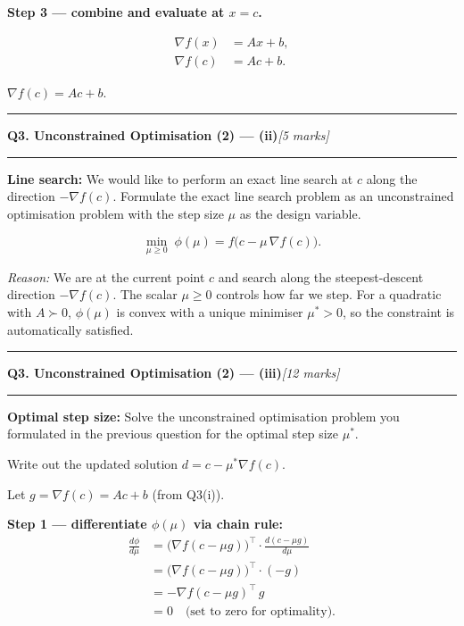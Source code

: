 \documentclass[10pt,a4paper]{article}
\newcommand{\sectitle}[2]{%
  \vspace{10pt}\noindent\rule{\linewidth}{0.8pt}\par\vspace{2pt}%
  {\large\textbf{#1}\hfill\normalsize\textit{[#2 marks]}}\par
  \vspace{2pt}\rule{\linewidth}{0.4pt}\vspace{4pt}}
\newcommand{\reason}[1]{%
  \begin{mdframed}[backgroundcolor=reasonbg, linewidth=0.4pt,
    innertopmargin=3pt, innerbottommargin=3pt,
    innerleftmargin=6pt, innerrightmargin=6pt]
    \small\textit{Reason:} \small #1
  \end{mdframed}\vspace{2pt}}
\newenvironment{resultbox}{%
  \begin{mdframed}[backgroundcolor=boxbg, linewidth=0.6pt,
    innertopmargin=5pt, innerbottommargin=5pt,
    innerleftmargin=8pt, innerrightmargin=8pt]
}{\end{mdframed}}
\begin{document}
\textbf{Step 3 --- combine and evaluate at $x = c$.}

\begin{align*}
  \nabla f(x) &= Ax + b, \\
  \nabla f(c) &= Ac + b.
\end{align*}

\begin{resultbox}
$\nabla f(c) = Ac + b$.
\end{resultbox}

\sectitle{Q3. Unconstrained Optimisation (2) --- (ii)}{5}

\noindent \textbf{Line search:} We would like to perform an exact line search
at $c$ along the direction $-\nabla f(c)$. Formulate the exact line search
problem as an unconstrained optimisation problem with the step size $\mu$
as the design variable.

\begin{resultbox}
\[
  \min_{\mu\ge 0}\;\phi(\mu) = f\!\bigl(c - \mu\,\nabla f(c)\bigr).
\]
\end{resultbox}

\reason{We are at the current point $c$ and search along the steepest-descent
        direction $-\nabla f(c)$. The scalar $\mu\ge 0$ controls how far we step.
        For a quadratic with $A\succ 0$, $\phi(\mu)$ is convex with a unique
        minimiser $\mu^*>0$, so the constraint is automatically satisfied.}

\newpage
\sectitle{Q3. Unconstrained Optimisation (2) --- (iii)}{12}

\noindent \textbf{Optimal step size:} Solve the unconstrained optimisation
problem you formulated in the previous question for the optimal step size
$\mu^*$.

Write out the updated solution $d = c - \mu^*\nabla f(c)$.

\medskip
Let $g = \nabla f(c) = Ac + b$ (from Q3(i)).

\medskip
\textbf{Step 1 --- differentiate $\phi(\mu)$ via chain rule:}
\begin{align*}
  \frac{d\phi}{d\mu}
  &= \bigl(\nabla f(c-\mu g)\bigr)^\top \cdot \frac{d(c-\mu g)}{d\mu} \\
  &= \bigl(\nabla f(c-\mu g)\bigr)^\top \cdot (-g) \\
  &= -\nabla f(c-\mu g)^\top\, g \\
  &= 0 \quad\text{(set to zero for optimality)}.
\end{align*}
\end{document}
